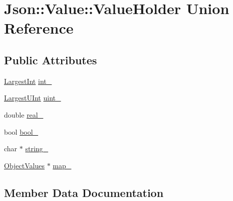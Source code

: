 \hypertarget{unionJson_1_1Value_1_1ValueHolder}{}\section{Json\+:\+:Value\+:\+:Value\+Holder Union Reference}
\label{unionJson_1_1Value_1_1ValueHolder}
\subsection*{Public Attributes}
\begin{DoxyCompactItemize}
\item 
\hyperlink{classJson_1_1Value_a1cbb82642ed05109b9833e49f042ece7_a1cbb82642ed05109b9833e49f042ece7}{Largest\+Int} \hyperlink{unionJson_1_1Value_1_1ValueHolder_adbfb384301298844ed955ba5cf6015a0_adbfb384301298844ed955ba5cf6015a0}{int\+\_\+}
\item 
\hyperlink{classJson_1_1Value_a6682a3684d635e03fc06ba229fa24eec_a6682a3684d635e03fc06ba229fa24eec}{Largest\+U\+Int} \hyperlink{unionJson_1_1Value_1_1ValueHolder_aab65665dc15a24a29a8e93cdeeaa7e50_aab65665dc15a24a29a8e93cdeeaa7e50}{uint\+\_\+}
\item 
double \hyperlink{unionJson_1_1Value_1_1ValueHolder_af0c5ca724e5fe3a15db773d750e2351e_af0c5ca724e5fe3a15db773d750e2351e}{real\+\_\+}
\item 
bool \hyperlink{unionJson_1_1Value_1_1ValueHolder_a92edab1861dadbfefd8be5fd4285eefe_a92edab1861dadbfefd8be5fd4285eefe}{bool\+\_\+}
\item 
char $\ast$ \hyperlink{unionJson_1_1Value_1_1ValueHolder_a70ac2b153bc405527baa3850d2ddc3cb_a70ac2b153bc405527baa3850d2ddc3cb}{string\+\_\+}
\item 
\hyperlink{classJson_1_1Value_a08b6c80c3af7071d908dabf044de5388_a08b6c80c3af7071d908dabf044de5388}{Object\+Values} $\ast$ \hyperlink{unionJson_1_1Value_1_1ValueHolder_a1e7a5b86d4f52234f55c847ad1ce389a_a1e7a5b86d4f52234f55c847ad1ce389a}{map\+\_\+}
\end{DoxyCompactItemize}


\subsection{Member Data Documentation}
\mbox{\label{unionJson_1_1Value_1_1ValueHolder_a92edab1861dadbfefd8be5fd4285eefe_a92edab1861dadbfefd8be5fd4285eefe}} 
